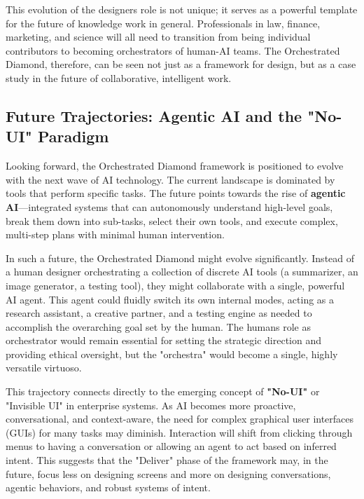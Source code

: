\documentclass[
  12pt,
  a4paper,
  bibliography=totoc,
  numbers=noenddot
]{scrartcl}
\begin{document}
This evolution of the designer\textquotesingle s role is not unique; it
serves as a powerful template for the future of knowledge work in
general. Professionals in law, finance, marketing, and science will all
need to transition from being individual contributors to becoming
orchestrators of human-AI teams. The Orchestrated Diamond, therefore,
can be seen not just as a framework for design, but as a case study in
the future of collaborative, intelligent work.

\subsection{Future Trajectories: Agentic
AI and the "No-UI"
Paradigm}\label{future-trajectories-agentic-ai-and-the-no-ui-paradigm}

Looking forward, the Orchestrated Diamond framework is positioned to
evolve with the next wave of AI technology. The current landscape is
dominated by tools that perform specific tasks. The future points
towards the rise of \textbf{agentic AI}---integrated systems that can
autonomously understand high-level goals, break them down into
sub-tasks, select their own tools, and execute complex, multi-step plans
with minimal human intervention.\cite{nice2025forrester}

In such a future, the Orchestrated Diamond might evolve significantly.
Instead of a human designer orchestrating a collection of discrete AI
tools (a summarizer, an image generator, a testing tool), they might
collaborate with a single, powerful AI agent. This agent could fluidly
switch its own internal modes, acting as a research assistant, a
creative partner, and a testing engine as needed to accomplish the
overarching goal set by the human.\cite{openai2025chatgpt} The
human\textquotesingle s role as orchestrator would remain essential for
setting the strategic direction and providing ethical oversight, but the
"orchestra" would become a single, highly versatile virtuoso.

This trajectory connects directly to the emerging concept of
\textbf{"No-UI"} or "Invisible UI" in enterprise
systems.\cite{sap2025interface} As AI becomes more proactive,
conversational, and context-aware, the need for complex graphical user
interfaces (GUIs) for many tasks may diminish.\cite{sap2025interface}
Interaction will shift from clicking through menus to having a
conversation or allowing an agent to act based on inferred intent. This
suggests that the "Deliver" phase of the framework may, in the future,
focus less on designing screens and more on designing conversations,
agentic behaviors, and robust systems of intent.
\end{document}
